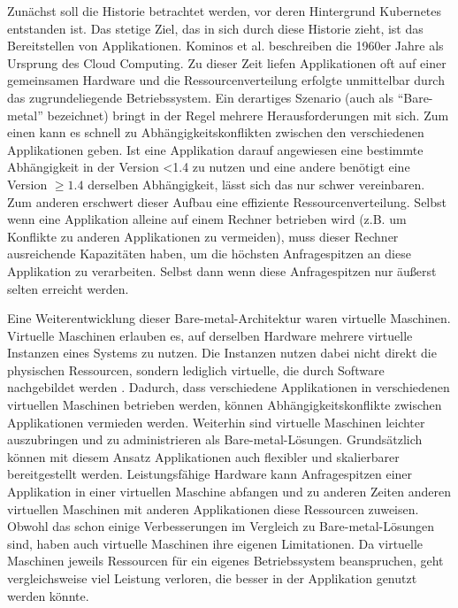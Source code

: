 \documentclass[11pt,a4paper]{article}
\begin{document}
Zunächst soll die Historie betrachtet werden, vor deren Hintergrund Kubernetes entstanden ist.
Das stetige Ziel, das in sich durch diese Historie zieht, ist das Bereitstellen von Applikationen.
Kominos et al. \cite{7899247} beschreiben die 1960er Jahre als Ursprung des Cloud Computing.
Zu dieser Zeit liefen Applikationen oft auf einer gemeinsamen Hardware und die Ressourcenverteilung erfolgte unmittelbar durch das zugrundeliegende Betriebssystem.
Ein derartiges Szenario (auch als ``Bare-metal'' bezeichnet) bringt in der Regel mehrere Herausforderungen mit sich.
Zum einen kann es schnell zu Abhängigkeitskonflikten zwischen den verschiedenen Applikationen geben.
Ist eine Applikation darauf angewiesen eine bestimmte Abhängigkeit in der Version <1.4 zu nutzen und eine andere
benötigt eine Version \(\geq 1.4\) derselben Abhängigkeit, lässt sich das nur schwer vereinbaren.
Zum anderen erschwert dieser Aufbau eine effiziente Ressourcenverteilung. Selbst wenn eine Applikation alleine auf einem Rechner betrieben wird (z.B. um Konflikte zu anderen
Applikationen zu vermeiden), muss dieser Rechner ausreichende Kapazitäten haben, um die höchsten Anfragespitzen an diese Applikation zu verarbeiten.
Selbst dann wenn diese Anfragespitzen nur äußerst selten erreicht werden.

Eine Weiterentwicklung dieser Bare-metal-Architektur waren virtuelle Maschinen. Virtuelle Maschinen erlauben es, auf derselben Hardware mehrere virtuelle Instanzen eines
Systems zu nutzen. Die Instanzen nutzen dabei nicht direkt die physischen Ressourcen, sondern lediglich virtuelle, die durch Software nachgebildet werden \cite{kofler2021docker}.
Dadurch, dass verschiedene Applikationen in verschiedenen virtuellen Maschinen betrieben werden, können Abhängigkeitskonflikte zwischen Applikationen
vermieden werden. Weiterhin sind virtuelle Maschinen leichter auszubringen und zu administrieren als Bare-metal-Lösungen.
Grundsätzlich können mit diesem Ansatz Applikationen auch flexibler und skalierbarer bereitgestellt werden.
Leistungsfähige Hardware kann Anfragespitzen einer Applikation in einer virtuellen Maschine abfangen und zu anderen Zeiten anderen virtuellen Maschinen mit anderen
Applikationen diese Ressourcen zuweisen.
Obwohl das schon einige Verbesserungen im Vergleich zu Bare-metal-Lösungen sind, haben auch virtuelle Maschinen ihre eigenen Limitationen.
Da virtuelle Maschinen jeweils Ressourcen für ein eigenes Betriebssystem beanspruchen, geht vergleichsweise viel Leistung verloren, 
die besser in der Applikation genutzt werden könnte.
\end{document}
